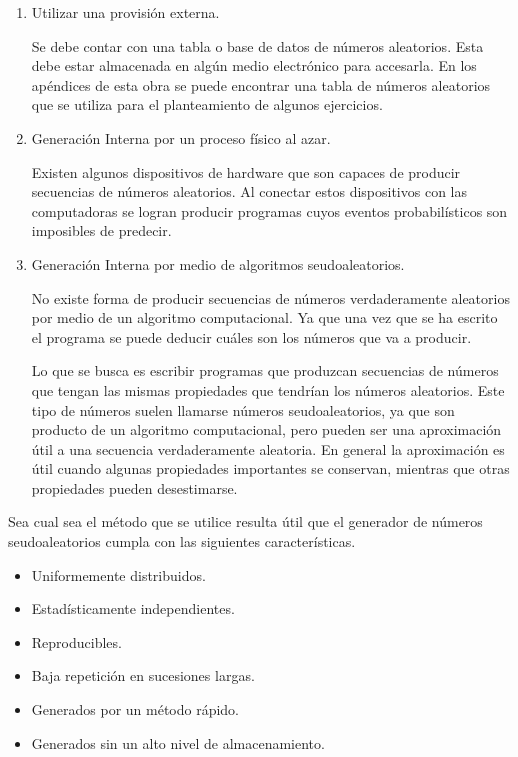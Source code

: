 \begin{enumerate}
 \item Utilizar una provisión externa.

Se debe contar con una tabla o base de datos de números aleatorios. Esta debe estar almacenada en algún medio electrónico para accesarla. En los apéndices de esta obra se puede encontrar una tabla de números aleatorios que se utiliza para el planteamiento de algunos ejercicios.


\item Generación Interna por un proceso físico al azar.

Existen algunos dispositivos de hardware que son capaces de producir secuencias de números aleatorios. Al conectar estos dispositivos con las computadoras se logran producir programas cuyos eventos probabilísticos son imposibles de predecir.


\item Generación Interna por medio de algoritmos seudoaleatorios.

No existe forma de producir secuencias de números verdaderamente aleatorios por medio de un algoritmo computacional. Ya que una vez que se ha escrito el programa se puede deducir cuáles son los números que va a producir. 

Lo que se busca es escribir programas que produzcan secuencias de números que tengan las mismas propiedades que tendrían los números aleatorios. Este tipo de números suelen llamarse números seudoaleatorios, ya que son producto de un algoritmo computacional, pero pueden ser una aproximación útil a una secuencia verdaderamente aleatoria. En general la aproximación es útil cuando algunas propiedades importantes se conservan, mientras que otras propiedades pueden desestimarse.

\end{enumerate}


 

Sea cual sea el método que se utilice resulta útil que el generador de números seudoaleatorios cumpla con las siguientes características.
\begin{itemize}
\item Uniformemente distribuidos.
\item Estadísticamente independientes.
\item Reproducibles.
\item Baja repetición en sucesiones largas.
\item Generados por un método rápido.
\item Generados sin un alto nivel de almacenamiento.
\end{itemize}



